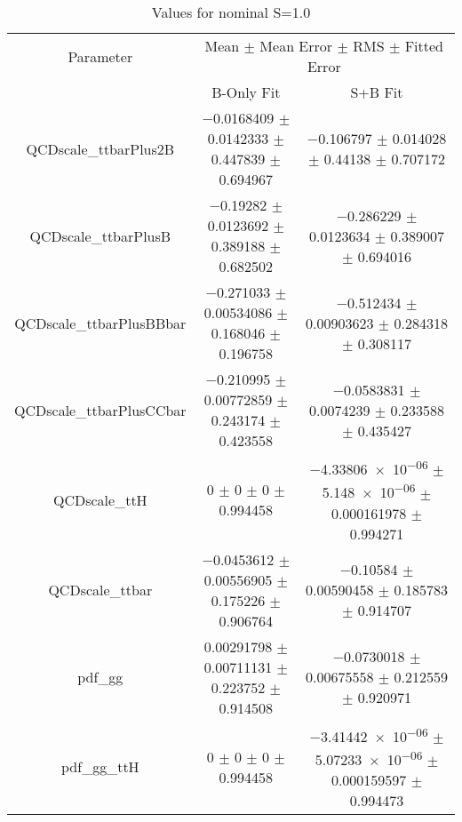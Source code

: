 \begin{table}
\centering
\caption{Values for nominal S=1.0}
\begin{tabular}{ccc}
\toprule
Parameter & \multicolumn{2}{c}{Mean $\pm$ Mean Error $\pm$ RMS $\pm$ Fitted Error}\\
 & B-Only Fit & S+B Fit\\
\midrule
QCDscale\_ttbarPlus2B & \num{-0.0168409} $\pm$ \num{0.0142333} $\pm$ \num{0.447839} $\pm$ \num{0.694967} & \num{-0.106797} $\pm$ \num{0.014028} $\pm$ \num{0.44138} $\pm$ \num{0.707172}\\
QCDscale\_ttbarPlusB & \num{-0.19282} $\pm$ \num{0.0123692} $\pm$ \num{0.389188} $\pm$ \num{0.682502} & \num{-0.286229} $\pm$ \num{0.0123634} $\pm$ \num{0.389007} $\pm$ \num{0.694016}\\
QCDscale\_ttbarPlusBBbar & \num{-0.271033} $\pm$ \num{0.00534086} $\pm$ \num{0.168046} $\pm$ \num{0.196758} & \num{-0.512434} $\pm$ \num{0.00903623} $\pm$ \num{0.284318} $\pm$ \num{0.308117}\\
QCDscale\_ttbarPlusCCbar & \num{-0.210995} $\pm$ \num{0.00772859} $\pm$ \num{0.243174} $\pm$ \num{0.423558} & \num{-0.0583831} $\pm$ \num{0.0074239} $\pm$ \num{0.233588} $\pm$ \num{0.435427}\\
QCDscale\_ttH & \num{0} $\pm$ \num{0} $\pm$ \num{0} $\pm$ \num{0.994458} & \num{-4.33806e-06} $\pm$ \num{5.148e-06} $\pm$ \num{0.000161978} $\pm$ \num{0.994271}\\
QCDscale\_ttbar & \num{-0.0453612} $\pm$ \num{0.00556905} $\pm$ \num{0.175226} $\pm$ \num{0.906764} & \num{-0.10584} $\pm$ \num{0.00590458} $\pm$ \num{0.185783} $\pm$ \num{0.914707}\\
pdf\_gg & \num{0.00291798} $\pm$ \num{0.00711131} $\pm$ \num{0.223752} $\pm$ \num{0.914508} & \num{-0.0730018} $\pm$ \num{0.00675558} $\pm$ \num{0.212559} $\pm$ \num{0.920971}\\
pdf\_gg\_ttH & \num{0} $\pm$ \num{0} $\pm$ \num{0} $\pm$ \num{0.994458} & \num{-3.41442e-06} $\pm$ \num{5.07233e-06} $\pm$ \num{0.000159597} $\pm$ \num{0.994473}\\
\bottomrule
\end{tabular}
\end{table}